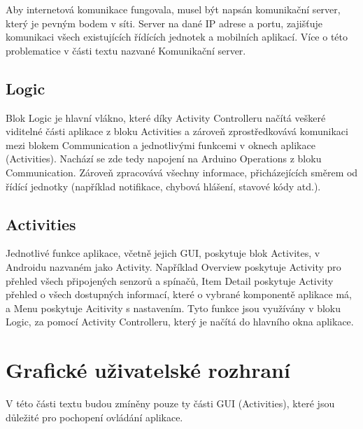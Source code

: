 \documentclass[FM,DP]{tulthesis}  %
\begin{document}
Aby internetová komunikace fungovala, musel být napsán komunikační server, který je pevným bodem v síti. Server na dané IP adrese a portu, zajišťuje komunikaci všech existujících řídících jednotek a mobilních aplikací. Více o této problematice v části textu nazvané Komunikační server.

\subsection{Logic}
Blok Logic je hlavní vlákno, které díky Activity Controlleru načítá veškeré viditelné části aplikace z bloku Activities a zároveň zprostředkovává komunikaci mezi blokem Communication a jednotlivými funkcemi v oknech aplikace (Activities). Nachází se zde tedy napojení na Arduino Operations z bloku Communication. Zároveň zpracovává všechny informace, přicházejících směrem od řídící jednotky (například notifikace, chybová hlášení, stavové kódy atd.).

\subsection{Activities}
Jednotlivé funkce aplikace, včetně jejich GUI, poskytuje blok Activites, v Androidu nazvaném jako Activity. Například Overview poskytuje Activity pro přehled všech připojených senzorů a spínačů, Item Detail poskytuje Activity přehled o všech dostupných informací, které o vybrané komponentě aplikace má, a Menu poskytuje Acitivity s nastavením. Tyto funkce jsou využívány v bloku Logic, za pomocí Activity Controlleru, který je načítá do hlavního okna aplikace.

\section{Grafické uživatelské rozhraní}
V této části textu budou zmíněny pouze ty části GUI (Activities), které jsou důležité pro pochopení ovládání aplikace.
\end{document}
